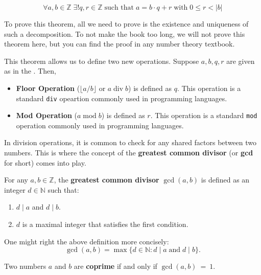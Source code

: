 \documentclass[../lecture-notes-148x210.tex]{subfiles}
\begin{document}
\begin{theorem}\label{th:division}
    \begin{equation*}
        \forall a, b \in \mathbb{Z} \; \exists! q, r \in \mathbb{Z} \; \text{such that} \; a = b \cdot q + r \; \text{with} \; 0 \leq r < |b|
    \end{equation*}
\end{theorem}

To prove this theorem, all we need to prove is the existence and uniqueness of
such a decomposition. To not make the book too long, we will not prove this
theorem here, but you can find the proof in any number theory textbook.

This theorem allows us to define two new operations. Suppose $a,b,q,r$ are given
as in the . Then,
\begin{itemize}
    \item \textbf{Floor Operation} ($\lfloor a/b \rfloor$ or $a \; \text{div} \;
b$) is defined as $q$. This operation is a standard \texttt{div} opeartion
commonly used in programming languages.
    \item \textbf{Mod Operation} ($a \; \text{mod} \; b$) is defined as $r$. This operation is a standard
\texttt{mod} operation commonly used in programming languages. 
\end{itemize}

In division operations, it is common to check for any shared factors between two
numbers. This is where the concept of the \textbf{greatest common divisor} (or
\textbf{gcd} for short) comes into play.

\begin{definition}[GCD]
    For any $a, b \in \mathbb{Z}$, the \textbf{greatest common divisor} $\gcd(a, b)$ is defined as an integer $d \in \mathbb{N}$ such that:
    \begin{enumerate}
        \item $d \mid a$ and $d \mid b$.
        \item $d$ is a maximal integer that satisfies the first condition.
    \end{enumerate}

    One might right the above definition more concisely:
    \begin{equation*}
        \gcd(a,b) = \max\{d \in \mathbb{N}: d \mid a \; \text{and} \; d \mid b\}.
    \end{equation*}
\end{definition}

\begin{definition}
    Two numbers $a$ and $b$ are \textbf{coprime} if and only if $\gcd(a, b)~=~1$.
\end{definition}
\end{document}
